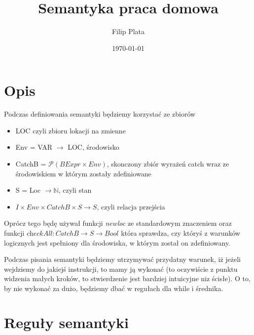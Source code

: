 \documentclass[11pt]{article}
\title{Semantyka praca domowa}
\author{Filip Plata}
\date{\today}
\begin{document}
\maketitle

\mathlig{->}{\rightarrow}
\mathlig{|-}{\vdash}
\mathlig{=>}{\Rightarrow}
\mathligson

\section{Opis}

Podczas definiowania semantyki będziemy korzystać ze zbiorów

\begin{itemize}
\item LOC czyli zbioru lokacji na zmienne
\item Env = VAR $\rightarrow$ LOC, środowisko
\item CatchB = $\mathcal{P}(BExpr \times Env)$, skonczony zbiór wyrażeń catch wraz ze środowiskiem w którym zostały zdefiniowane
\item S = Loc $\rightarrow \mathbb{N}$, czyli stan
\item $I \times Env \times CatchB \times S \rightarrow S$, czyli relacja przejścia
\end{itemize}

Oprócz tego będę używał funkcji \textit{newloc} ze standardowym znaczeniem oraz funkcji 
$\textit{checkAll} : CatchB \rightarrow S \rightarrow Bool$ która sprawdza, czy któryś z warunków logicznych jest spełniony dla środowiska, w którym został on zdefiniowany.

Podczas pisania semantyki będziemy utrzymywać przydatny warunek, iż jeżeli wejdziemy do jakiejś instrukcji, to mamy ją wykonać (to oczywiście z punktu widzenia małych kroków, to stwierdzenie jest bardziej intuicyjne niz ścisłe). O to, by nie wykonać za dużo, będziemy dbać w regułach dla while i średnika.

\section{Reguły semantyki}
\end{document}
